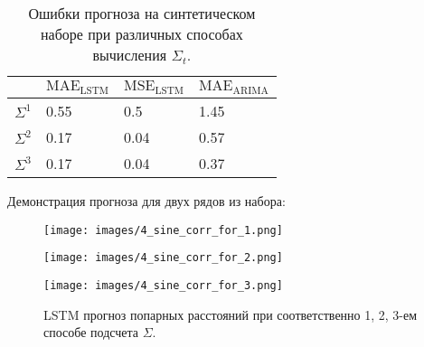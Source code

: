 \documentclass{article}
\begin{document}

\begin{comment}
\begin{figure}[h]
  \begin{minipage}{0.5\textwidth}
    \centering
    \texttt{[image: images/4\_sine\_corr\_1\_.png]}
    \caption{Временные ряды попарных расстояний при 1-ом способе подсчета $\Sigma$}
  \end{minipage}\hfill
  \begin{minipage}{0.5\textwidth}
    \centering
    \texttt{[image: images/4\_sine\_corr\_2\_.png]}
    \caption{Временные ряды попарных расстояний при 2-ом способе подсчета $\Sigma$}
  \end{minipage}
\end{figure}

\begin{figure}[h]
  \centering
  \begin{minipage}{0.5\textwidth}
    \centering
    \texttt{[image: images/4\_sine\_corr\_3\_.png]}
    \caption{Временные ряды попарных расстояний при 3-ом способе подсчета $\Sigma$}
  \end{minipage}\hfill
\end{figure}
\end{comment}



\begin{table}[h]
\centering
\begin{tabular}{|l|l|l|l|}
\hline  
         & $\text{MAE}_{\text{LSTM}}$  & $\text{MSE}_{\text{LSTM}}$  & $\text{MAE}_{\text{ARIMA}}$\\ \hline
${\Sigma}^1$ & 0.55 & 0.5 & 1.45 \\ \hline
${\Sigma}^2$ & 0.17 & 0.04 & 0.57 \\ \hline
${\Sigma}^3$ & 0.17 & 0.04 & 0.37 \\ \hline
\end{tabular}
\caption{Ошибки прогноза на синтетическом наборе при различных способах вычисления $\Sigma_t$.}
\label{tab:stat}
\end{table}

Демонстрация прогноза для двух рядов из набора:

\newpage

\begin{figure}[h]
  \begin{minipage}{0.33\textwidth}
    \centering
    \texttt{[image: images/4\_sine\_corr\_for\_1.png]}
  \end{minipage}\hfill
  \begin{minipage}{0.33\textwidth}
    \centering
    \texttt{[image: images/4\_sine\_corr\_for\_2.png]}
  \end{minipage}
  \begin{minipage}{0.33\textwidth}
    \centering
    \texttt{[image: images/4\_sine\_corr\_for\_3.png]}
  \end{minipage}
  \caption{LSTM прогноз попарных расстояний при соответственно 1, 2, 3-ем способе подсчета $\Sigma$.}
\end{figure}
\end{document}
